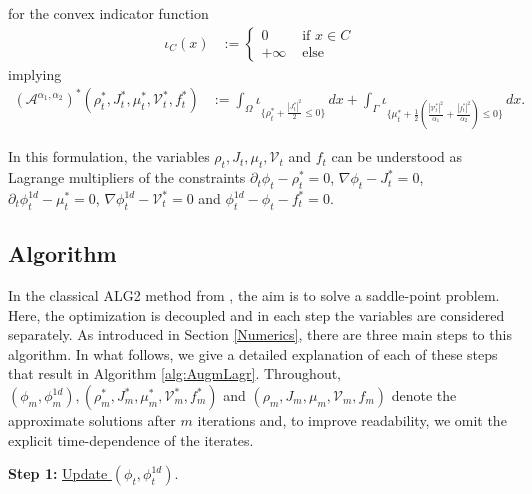 \documentclass{article}
\def\calA{{\mathcal A}} \def\calB{{\mathcal B}} \def\calC{{\mathcal C}}
\begin{document}
for the convex indicator function 
\begin{align*}
    \iota_C (x) &:= \begin{cases}
        0 & \text { if } x\in C\\ +\infty & \text{ else}
    \end{cases}
\end{align*}
implying
\begin{align*}
    \left(\calA^{\alpha_1, \alpha_2}\right)^*(\rho_t^*, J_t^*, \mu_t^*, \mathcal{V}_t^*, f_t^*) &:= \int_\Omega \iota_{\{\rho_t^*+\frac{|J_t^*|^2}{2}\leq 0\}} \, dx + \int_\Gamma \iota_{\{\mu_t^* + \frac{1}{2}\left( \frac{|\mathcal{V}_t^*|^2}{\alpha_1} + \frac{|f_t^*|^2}{\alpha_2}\right)\leq 0\}} \, dx .
\end{align*}

In this formulation, the variables $\rho_t, J_t, \mu_t, \mathcal{V}_t$ and $f_t$ can be understood as Lagrange multipliers of the constraints $\partial_t\phi_t - \rho_t^* = 0$, $\nabla\phi_t - J_t^* = 0$, $\partial_t\phi^{1d}_t - \mu_t^*=0$, $\nabla\phi_t^{1d} - \mathcal{V}_t^* = 0$ and $\phi_t^{1d} - \phi_t - f_t^* = 0$. 


\subsection{Algorithm}\label{DetailsAlg}

In the classical ALG2 method from \cite{augmented_1983}, the aim is to solve a saddle-point problem. Here, the optimization is decoupled and in each step the variables are considered separately. As introduced in Section \ref{Numerics}, there are three main steps to this algorithm. In what follows, we give a detailed explanation of each of these steps that result in Algorithm \ref{alg:AugmLagr}. Throughout, $(\phi_m, \phi^{1d}_m), (\rho^*_m, J^*_m, \mu^*_m, \mathcal{V}^*_m, f^*_m)$ and $(\rho_m, J_m, \mu_m, \mathcal{V}_m, f_m)$ denote the approximate solutions after $m$ iterations and, to improve readability, we omit the explicit time-dependence of the iterates.

\medskip 
\noindent \textbf{Step 1:} \underline{Update $(\phi_t, \phi_t^{1d})$}.
\end{document}
